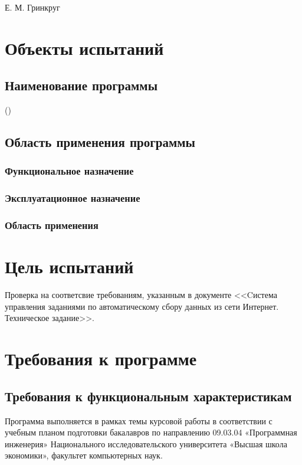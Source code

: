 \documentclass[a4paper,12pt]{article}
\begin{document}
	
	{Е. М. Гринкруг}
	
	\firstPage
	\newpage
	\secondPage
	\newpage
	\thirdPage
	\newpage
	
	\section{Объекты испытаний}
	\subsection{Наименование программы}
	 ()
	\subsection{Область применения программы}
	\subsubsection{Функциональное назначение}
	
	\subsubsection{Эксплуатационное назначение}
	
	\subsubsection{Область применения}
	
					\newpage
	\section{Цель испытаний}
	Проверка на соответсвие требованиям, указанным в документе <<Cистема управления заданиями по автоматическому сбору данных из сети Интернет. Техническое задание>>.
					\newpage 
	\section{Требования к программе}
	\subsection{Требования к функциональным характеристикам}
	Программа выполняется в рамках темы курсовой работы в соответствии с учебным планом подготовки бакалавров по направлению 09.03.04 «Программная инженерия» Национального исследовательского университета «Высшая школа экономики», факультет компьютерных наук.
	
\end{document}
